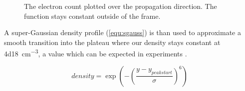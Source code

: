 \documentclass[bachelor_thesis]{subfiles}
\begin{document}
\begin{figure}
	\centering
	
	\caption{The electron count plotted over the propagation direction. The function stays constant outside of the frame.}
	\label{fig:dens}
\end{figure}

A super-Gaussian density profile (\autoref{equ:sgauss}) is than used to approximate a smooth transition into the plateau where our density stays constant at \qty{4d18}{\cm^{-3}}, a value which can be expected in experiments \cite{Schoebel2022, Kurz2021}. 

\begin{equation}
	density = \exp\left(-\left(\frac{y-y_{peak start}}{\sigma}\right)^6\right)
	\label{equ:sgauss}
\end{equation}
\end{document}

